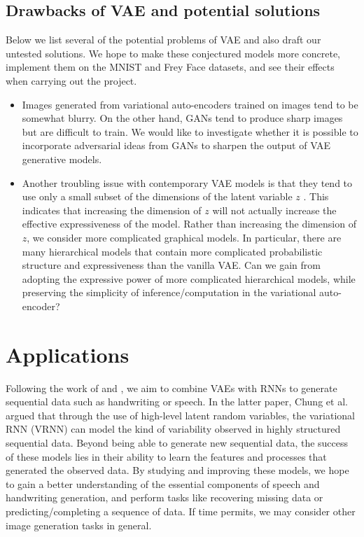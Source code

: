\documentclass[11pt]{article}
\begin{document}
\subsection*{Drawbacks of VAE and potential solutions}

Below we list several of the potential problems of VAE and also draft our untested solutions. We hope to make these conjectured models more concrete, implement them on the MNIST and Frey Face datasets, and see their effects when carrying out the project.

\begin{itemize}
\item Images generated from variational auto-encoders trained on images tend to be somewhat blurry. \cite{Goodfellow-et-al-2016-Book} On the other hand, GANs tend to produce sharp images but are difficult to train. We would like to investigate whether it is possible to incorporate adversarial ideas from GANs to sharpen the output of VAE generative models.
\item Another troubling issue with contemporary VAE models is that they tend to use only a small subset of the dimensions of the latent variable $z$ \cite{Goodfellow-et-al-2016-Book}. This indicates that increasing the dimension of $z$ will not actually increase the effective expressiveness of the model. Rather than increasing the dimension of $z$, we consider more complicated graphical models. In particular, there are many hierarchical models that contain more complicated probabilistic structure and expressiveness than the vanilla VAE. Can we gain from adopting the expressive power of more complicated hierarchical models, while preserving the simplicity of inference/computation in the variational auto-encoder?
\end{itemize}

\section*{Applications}
Following the work of \cite{gregor2015draw} and \cite{chung2015recurrent}, we aim to combine VAEs with RNNs to generate sequential data such as handwriting or speech. In the latter paper, Chung et al. argued that through the use of high-level latent random variables, the variational RNN (VRNN) can model the kind of variability observed in highly structured sequential data. Beyond being able to generate new sequential data, the success of these models lies in their ability to learn the features and processes that generated the observed data. By studying and improving these models, we hope to gain a better understanding of the essential components of speech and handwriting generation, and perform tasks like recovering missing data or predicting/completing a sequence of data. If time permits, we may consider other image generation tasks in general.
\end{document}
